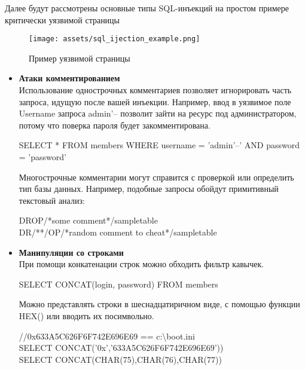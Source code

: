 Далее будут рассмотрены основные типы SQL-инъекций \autocite{proglib, SqlInjection} на простом примере критически уязвимой страницы
\begin{figure}[h]
    \centering
    \texttt{[image: assets/sql\_ijection\_example.png]}
    \caption{Пример уязвимой страницы}
    \label{fig:mesh}
\end{figure}

\begin{itemize}
    \item \textbf{Атаки комментированием}\\
    Использование однострочных комментариев позволяет игнорировать часть запроса, идущую после вашей инъекции. Например, ввод в уязвимое поле Username запроса admin'-- позволит зайти на ресурс под администратором, потому что поверка пароля будет закомментирована.\\
    \begin{grayquote}
        SELECT * FROM members WHERE username = 'admin'--' AND password = 'password'
    \end{grayquote}

    Многострочные комментарии могут справится с проверкой или определить тип базы данных.
    Например, подобные запросы обойдут примитивный текстовый анализ:\\
    \begin{grayquote}
        DROP/*some comment*/sampletable\\
        DR/**/OP/*random comment to cheat*/sampletable
    \end{grayquote}

    \item \textbf{Манипуляции со строками}\\
    При помощи конкатенации строк можно обходить фильтр кавычек.\\
    \begin{grayquote}
        SELECT CONCAT(login, password) FROM members
    \end{grayquote}

    Можно представлять строки в шеснадцатиричном виде, с помощью функции HEX() или вводить их посимвольно.
    \begin{grayquote}
        //0x633A5C626F6F742E696E69 == c:\textbackslash boot.ini\\
        SELECT CONCAT('0x','633A5C626F6F742E696E69'))\\
        SELECT CONCAT(CHAR(75),CHAR(76),CHAR(77))
    \end{grayquote}


\end{itemize}

